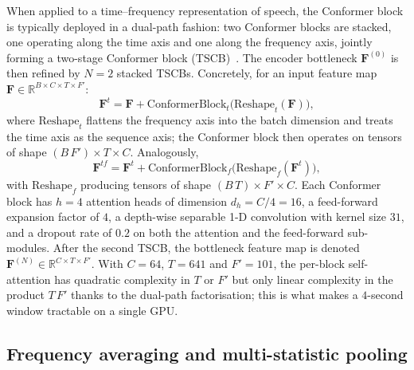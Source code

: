\documentclass[a4paper,fleqn]{cas-sc}
\begin{document}
When applied to a time--frequency representation of speech, the
Conformer block is typically deployed in a dual-path fashion: two
Conformer blocks are stacked, one operating along the time axis and one
along the frequency axis, jointly forming a two-stage Conformer block
(TSCB)~\citep{cao2022cmgan}. The encoder bottleneck $\mathbf{F}^{(0)}$
is then refined by $N=2$ stacked TSCBs. Concretely, for an input
feature map $\mathbf{F}\in\mathbb{R}^{B\times C\times T\times F'}$:
\begin{equation}\label{eq:tscb_time}
  \mathbf{F}^{t} = \mathbf{F}
      + \mathrm{ConformerBlock}_{t}\bigl(\mathrm{Reshape}_{t}(\mathbf{F})\bigr),
\end{equation}
where $\mathrm{Reshape}_{t}$ flattens the frequency axis into the batch
dimension and treats the time axis as the sequence axis; the Conformer
block then operates on tensors of shape $(B\,F')\times T\times C$.
Analogously,
\begin{equation}\label{eq:tscb_freq}
  \mathbf{F}^{tf} = \mathbf{F}^{t}
      + \mathrm{ConformerBlock}_{f}\bigl(\mathrm{Reshape}_{f}(\mathbf{F}^{t})\bigr),
\end{equation}
with $\mathrm{Reshape}_{f}$ producing tensors of shape $(B\,T)\times
F'\times C$. Each Conformer block has $h=4$ attention heads of dimension
$d_h=C/4=16$, a feed-forward expansion factor of $4$, a depth-wise
separable 1-D convolution with kernel size $31$, and a dropout rate of
$0.2$ on both the attention and the feed-forward sub-modules. After
the second TSCB, the bottleneck feature map is denoted
$\mathbf{F}^{(N)}\in\mathbb{R}^{C\times T\times F'}$. With $C=64$,
$T=641$ and $F'=101$, the per-block self-attention has quadratic
complexity in $T$ or $F'$ but only linear complexity in the product
$T\,F'$ thanks to the dual-path factorisation; this is what makes a
$4$-second window tractable on a single GPU.

\subsection{Frequency averaging and multi-statistic pooling}\label{sec:method:pool}
\end{document}
